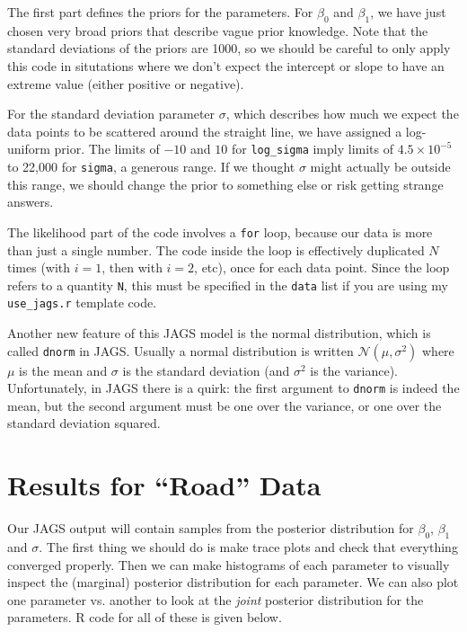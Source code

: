 The first part defines the priors for the parameters. For $\beta_0$ and $\beta_1$,
we have just chosen very broad priors that describe vague prior knowledge. Note
that the standard deviations of the priors are 1000, so we should be careful
to only apply this code in situtations where we don't expect the intercept or
slope to have an extreme value (either positive or negative).

For the standard deviation parameter $\sigma$, which describes how much we
expect the data points to be scattered around the straight line, we have assigned
a log-uniform prior. The limits of $-10$ and $10$ for {\tt log\_sigma} imply
limits of $4.5 \times 10^{-5}$ to 22,000 for {\tt sigma}, a generous range.
If we thought $\sigma$
might actually be outside this range, we should change the prior to something
else or risk getting strange answers.

The likelihood part of the code involves a {\tt for} loop, because our data
is more than just a single number. The code inside the loop is effectively
duplicated $N$ times (with $i=1$, then with $i=2$, etc), once for each data
point. Since the loop refers to a quantity {\tt N}, this must be specified in
the {\tt data} list if you are using my {\tt use\_jags.r} template code.

Another new feature of this JAGS model is the normal distribution, which is
called {\tt dnorm} in JAGS. Usually a normal distribution is written
$\mathcal{N}(\mu, \sigma^2)$ where $\mu$ is the mean and $\sigma$ is the standard
deviation (and $\sigma^2$ is the variance). Unfortunately, in JAGS there is a
quirk: the first argument to {\tt dnorm} is indeed the mean, but the second argument
must be one over the variance, or one over the standard deviation squared.

\section{Results for ``Road'' Data}
Our JAGS output will contain samples from the posterior distribution for
$\beta_0$, $\beta_1$ and $\sigma$. The first thing we should do is make
trace plots and check that everything converged properly. Then we can make
histograms of each parameter to visually inspect the (marginal) posterior
distribution for each parameter. We can also plot one parameter vs. another
to look at the {\it joint} posterior distribution for the parameters. R code
for all of these is given below.

